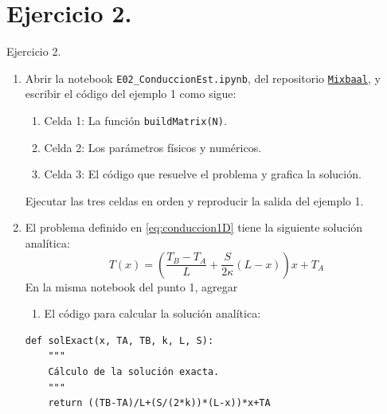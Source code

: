 \documentclass{beamer}
\begin{document}
\section{Ejercicio 2.}

\begin{frame}[fragile]
	
{\small 
\begin{exampleblock}{Ejercicio 2.}
\begin{enumerate}
	\item Abrir la notebook \texttt{E02\_ConduccionEst.ipynb}, del repositorio \href{https://github.com/luiggix/Mixbaal}{\texttt{Mixbaal}}, 
	y escribir el código del ejemplo 1 como sigue:
 	\begin{enumerate}[a]
		\item {\footnotesize Celda 1: La función \texttt{buildMatrix(N)}.}
		\item {\footnotesize Celda 2: Los parámetros físicos y numéricos.}
		\item {\footnotesize Celda 3: El código que resuelve el problema y grafica la solución.}
	\end{enumerate}
	Ejecutar las tres celdas en orden y reproducir la salida del ejemplo 1.
	\item El problema definido en \eqref{eq:conduccion1D} tiene la siguiente solución analítica:
	$$\displaystyle
	T(x) =
	\boxed{\left(\frac{T_B - T_A}{L} + \frac{S}{2\kappa} \left(L - x\right) \right)x + T_A}
	$$
	En la misma notebook del punto 1, agregar 
	\begin{enumerate}[a]
	\item El código para calcular la solución analítica:
	\end{enumerate}
\begin{lstlisting}
def solExact(x, TA, TB, k, L, S):
    """
    Cálculo de la solución exacta.
    """
    return ((TB-TA)/L+(S/(2*k))*(L-x))*x+TA
\end{lstlisting}

\end{enumerate}
\end{exampleblock}
}
\end{frame}
\end{document}
